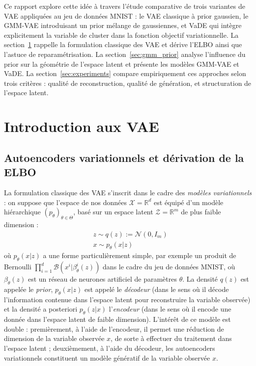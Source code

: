 \documentclass{article}
\begin{document}
    Ce rapport explore cette idée à travers l'étude comparative de trois variantes de VAE appliquées au jeu de données MNIST : le VAE classique à prior gaussien, le GMM-VAE \cite{dilokthanakulDeepUnsupervisedClustering2017} introduisant un prior mélange de gaussiennes, et VaDE \cite{jiangVariationalDeepEmbedding2017} qui intègre explicitement la variable de cluster dans la fonction objectif variationnelle. La section~\ref{sec:vae_intro} rappelle la formulation classique des VAE et dérive l'ELBO ainsi que l'astuce de reparamétrisation. La section~\ref{sec:gmm_prior} analyse l'influence du prior sur la géométrie de l'espace latent et présente les modèles GMM-VAE et VaDE. La section~\ref{sec:experiments} compare empiriquement ces approches selon trois critères : qualité de reconstruction, qualité de génération, et structuration de l'espace latent.

\section{Introduction aux VAE}
\label{sec:vae_intro}
    \subsection{Autoencoders variationnels et dérivation de la ELBO}

        La formulation classique des VAE \cite{kingmaAutoEncodingVariationalBayes2022} s'inscrit dans le cadre des \textit{modèles variationnels} : on suppose que l'espace de nos données $\mathcal X = \mathbb R^d$ est équipé d'un modèle hiérarchique $(p_\theta)_{\theta \in \Theta}$, basé sur un espace latent $\mathcal Z = \mathbb R^m$ de plus faible dimension :
        \begin{align*}
            & z \sim q(z) := \mathcal{N}(0, I_m) \\
            & x \sim p_\theta(x|z) 
        \end{align*}
        où $p_\theta(x|z)$ a une forme particulièrement simple, par exemple un produit de Bernoulli $\prod_{i=1}^d \mathcal B(x^i|\beta_\theta^i(z))$ dans le cadre du jeu de données MNIST, où $\beta_\theta(z)$ est un réseau de neurones artificiel de paramètres $\theta$. La densité $q(z)$ est appelée le \textit{prior}, $p_\theta(x|z)$ est appelé le \textit{décodeur} (dans le sens où il décode l'information contenue dans l'espace latent pour reconstruire la variable observée) et la densité a posteriori $p_\theta(z|x)$ l'\textit{encodeur} (dans le sens où il encode une donnée dans l'espace latent de faible dimension). L'intérêt de ce modèle est double : premièrement, à l'aide de l'encodeur, il permet une réduction de dimension de la variable observée $x$, de sorte à effectuer du traitement dans l'espace latent ; deuxièmement, à l'aide du décodeur, les autoencoders variationnels constituent un modèle génératif de la variable observée $x$.\\
\end{document}
